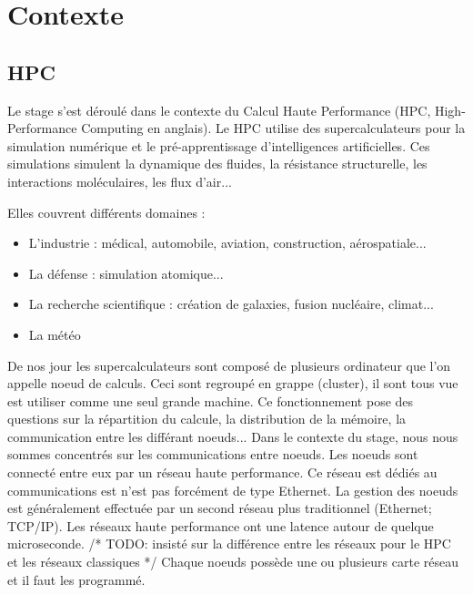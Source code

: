\section{Contexte}

\subsection{HPC}

Le stage s'est déroulé dans le contexte du Calcul Haute Performance (HPC, High-Performance Computing en anglais).
Le HPC utilise des supercalculateurs pour la simulation numérique et le pré-apprentissage d'intelligences artificielles.
Ces simulations simulent la dynamique des fluides, la résistance structurelle, les interactions moléculaires, les flux d'air...

\bigskip

\noindent{}Elles couvrent différents domaines :
\begin{itemize}
  \item L'industrie : médical, automobile, aviation, construction, aérospatiale...
  \item La défense : simulation atomique...
  \item La recherche scientifique : création de galaxies, fusion nucléaire, climat...
  \item La météo
\end{itemize}

\bigskip

De nos jour les supercalculateurs sont composé de plusieurs ordinateur que l'on appelle noeud de calculs.
Ceci sont regroupé en grappe (cluster), il sont tous vue est utiliser comme une seul grande machine.
Ce fonctionnement pose des questions sur la répartition du calcule, la distribution de la mémoire, la communication entre les différant noeuds...
Dans le contexte du stage, nous nous sommes concentrés sur les communications entre noeuds.
Les noeuds sont connecté entre eux par un réseau haute performance.
Ce réseau est dédiés au communications est n'est pas forcément de type Ethernet.
La gestion des noeuds est généralement effectuée par un second réseau plus traditionnel (Ethernet; TCP/IP).
Les réseaux haute performance ont une latence autour de quelque microseconde.
/* TODO: insisté sur la différence entre les réseaux pour le HPC et les réseaux classiques */
Chaque noeuds possède une ou plusieurs carte réseau et il faut les programmé.

